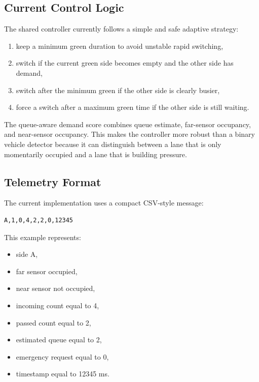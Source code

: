 \documentclass[11pt,a4paper]{article}
\begin{document}
\subsection{Current Control Logic}

The shared controller currently follows a simple and safe adaptive strategy:

\begin{enumerate}
    \item keep a minimum green duration to avoid unstable rapid switching,
    \item switch if the current green side becomes empty and the other side has demand,
    \item switch after the minimum green if the other side is clearly busier,
    \item force a switch after a maximum green time if the other side is still waiting.
\end{enumerate}

The queue-aware demand score combines queue estimate, far-sensor occupancy, and near-sensor occupancy. This makes the controller more robust than a binary vehicle detector because it can distinguish between a lane that is only momentarily occupied and a lane that is building pressure.

\subsection{Telemetry Format}

The current implementation uses a compact CSV-style message:

\begin{lstlisting}
A,1,0,4,2,2,0,12345
\end{lstlisting}

This example represents:

\begin{itemize}
    \item side A,
    \item far sensor occupied,
    \item near sensor not occupied,
    \item incoming count equal to 4,
    \item passed count equal to 2,
    \item estimated queue equal to 2,
    \item emergency request equal to 0,
    \item timestamp equal to 12345 ms.
\end{itemize}
\end{document}
